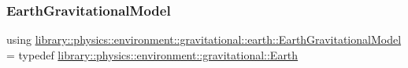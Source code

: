 \subsubsection{\texorpdfstring{Earth\+Gravitational\+Model}{EarthGravitationalModel}}
{\footnotesize\ttfamily using \hyperlink{namespacelibrary_1_1physics_1_1environment_1_1gravitational_1_1earth_a37840632ad4cdb3452b8dac84ed6e176}{library\+::physics\+::environment\+::gravitational\+::earth\+::\+Earth\+Gravitational\+Model} = typedef \hyperlink{classlibrary_1_1physics_1_1environment_1_1gravitational_1_1_earth}{library\+::physics\+::environment\+::gravitational\+::\+Earth}}


